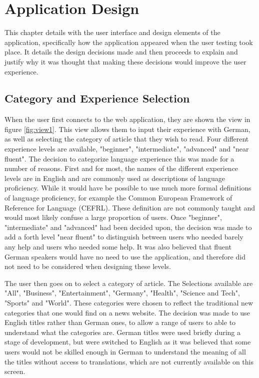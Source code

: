 \chapter{Application Design}

This chapter details with the user interface and design elements of the application, specifically how the application appeared when the user testing took place. It details the design decisions made and then proceeds to explain and justify why it was thought that making these decisions would improve the user experience.

\section{Category and Experience Selection}

When the user first connects to the web application, they are shown the view in figure \ref{fig:view1}. This view allows them to input their experience with German, as well as selecting the category of article that they wish to read. Four different experience levels are available, "beginner", "intermediate", "advanced" and "near fluent". The decision to categorize language experience this was made for a number of reasons. First and for most, the names of the different experience levels are in English and are commonly used as descriptions of language proficiency. While it would have be possible to use much more formal definitions of language proficiency, for example the Common European Framework of Reference for Language (CEFRL). These definition are not commonly taught and would most likely confuse a large proportion of users. Once "beginner", "intermediate" and "advanced" had been decided upon, the decision was made to add a forth level "near fluent" to distinguish between users  who needed barely any help and users who needed some help. It was also believed that fluent German speakers would have no need to use the application, and therefore did not need to be considered when designing these levels.



The user then goes on to select a category of article. The Selections available are "All", "Business", "Entertainment", "Germany", "Health", "Science and Tech", "Sports" and "World". These categories were chosen to reflect the traditional new categories that one would find on a news website. The decision was made to use English titles rather than German ones, to allow a range of users to able to understand what the categories are. German titles were used briefly during a stage of development, but were switched to English as it was believed that some users would not be skilled enough in German to understand the meaning of all the titles without access to translations, which are not currently available on this screen. 

